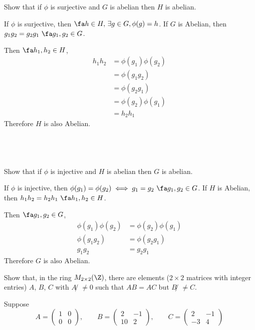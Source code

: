 \documentclass[a4paper]{article}
\begin{document}
\begin{questionbody}
Show that if $\phi$ is surjective and $G$ is abelian then $H$ is abelian.
\end{questionbody}

If $\phi$ is surjective, then $\fa h \in H,\, \exists g \in G, \phi(g) = h$. If $G$ is Abelian, then $g_1 g_2 = g_2 g_1\ \fa g_1, g_2 \in G$.

Then $\fa h_1, h_2 \in H$, \begin{align*}
    h_1 h_2 &= \phi(g_1) \phi(g_2) \\[1ex]
                     &= \phi(g_1 g_2) \\[1ex]
                     &= \phi(g_2 g_1) \\[1ex]
                     &= \phi(g_2) \phi(g_1) \\[1ex]
                     &= h_2 h_1
\end{align*}
Therefore $H$ is also Abelian.

\subsection{~} %

\begin{questionbody}
Show that if $\phi$ is injective and $H$ is abelian then $G$ is abelian.
\end{questionbody}

If $\phi$ is injective, then $\phi(g_1) = \phi(g_2) \iff g_1 = g_2\ \fa g_1, g_2 \in G$. If $H$ is Abelian, then $h_1 h_2 = h_2 h_1\ \fa h_1, h_2 \in H$.

Then $\fa g_1, g_2 \in G$, \begin{align*}
    \phi(g_1) \phi(g_2) &= \phi(g_2) \phi(g_1) \\[1ex]
    \phi(g_1 g_2) &= \phi(g_2 g_1) \\[1ex]
    g_1 g_2 &= g_2 g_1
\end{align*}
Therefore $G$ is also Abelian.


\begin{questionbody}
Show that, in the ring $M_{2 \times 2}(\Z)$, there are elements ($2 \times 2$ matrices with integer entries) $A$, $B$, $C$ with $A̸ \ne 0$ such that $AB = AC$ but $B̸ \ne C$.
\end{questionbody}

Suppose \[
A = \begin{pmatrix}1 & 0 \\ 0 & 0\end{pmatrix},
\qquad B = \begin{pmatrix}2 & -1 \\ 10 & 2\end{pmatrix},
\qquad C = \begin{pmatrix}2 & -1 \\ -3 & 4\end{pmatrix}
\]
\end{document}

